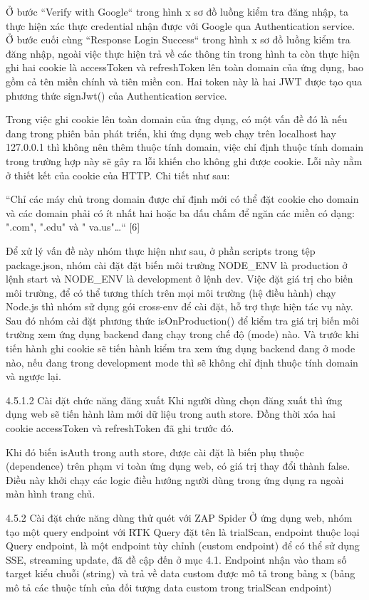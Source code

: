 Ở bước “Verify with Google“ trong hình x sơ đồ luồng kiểm tra đăng nhập, ta thực hiện xác thực credential nhận được với Google qua Authentication service. Ở bước cuối cùng “Response Login Success“ trong hình x sơ đồ luồng kiểm tra đăng nhập, ngoài việc thực hiện trả về các thông tin trong hình ta còn thực hiện ghi hai cookie là accessToken và refreshToken lên toàn domain của ứng dụng, bao gồm cả tên miền chính và tiên miền con. Hai token này là hai JWT được tạo qua phương thức signJwt() của Authentication service.

Trong việc ghi cookie lên toàn domain của ứng dụng, có một vấn đề đó là nếu đang trong phiên bản phát triển, khi ứng dụng web chạy trên localhost hay 127.0.0.1 thì không nên thêm thuộc tính domain, việc chỉ định thuộc tính domain trong trường hợp này sẽ gây ra lỗi khiến cho không ghi được cookie. Lỗi này nằm ở thiết kết của cookie của HTTP. Chi tiết như sau:

“Chỉ các máy chủ trong domain được chỉ định mới có thể đặt cookie cho domain và các domain phải có ít nhất hai hoặc ba dấu chấm để ngăn các miền có dạng: ".com", ".edu" và " va.us"…“ [6]

Để xử lý vấn đề này nhóm thực hiện như sau, ở phần scripts trong tệp package.json, nhóm cài đặt đặt biến môi trường NODE\_ENV là production ở lệnh start và NODE\_ENV là development ở lệnh dev. Việc đặt giá trị cho biến môi trường, để có thể tương thích trên mọi môi trường (hệ điều hành) chạy Node.js thì nhóm sử dụng gói cross-env để cài đặt, hỗ trợ thực hiện tác vụ này. Sau đó nhóm cài đặt phương thức isOnProduction() để kiểm tra giá trị biến môi trường xem ứng dụng backend đang chạy trong chế độ (mode) nào. Và trước khi tiến hành ghi cookie sẽ tiến hành kiểm tra xem ứng dụng backend đang ở mode nào, nếu đang trong development mode thì sẽ không chỉ định thuộc tính domain và ngược lại.

4.5.1.2 Cài đặt chức  năng đăng xuất 
Khi người dùng chọn đăng xuất thì ứng dụng web sẽ tiến hành làm mới dữ liệu trong auth store. Đồng thời xóa hai cookie accessToken và refreshToken đã ghi trước đó.

Khi đó biến isAuth trong auth store, được cài đặt là biến phụ thuộc (dependence) trên phạm vi toàn ứng dụng web, có giá trị thay đổi thành false. Điều này khởi chạy các logic điều hướng người dùng trong ứng dụng ra ngoài màn hình trang chủ.

4.5.2 Cài đặt chức năng dùng thử quét với ZAP Spider
Ở ứng dụng web, nhóm tạo một query endpoint với RTK Query đặt tên là trialScan, endpoint thuộc loại Query endpoint, là một endpoint tùy chỉnh (custom endpoint) để có thể sử dụng SSE, streaming update, đã đề cập đến ở mục 4.1. Endpoint nhận vào tham số target kiểu chuỗi (string) và trả về data custom được mô tả trong bảng x (bảng mô tả các thuộc tính của đối tượng data custom trong trialScan endpoint)

